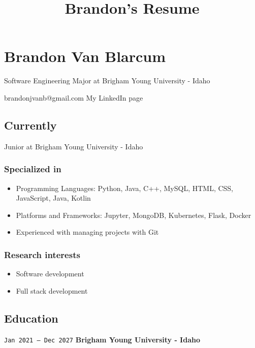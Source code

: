 \documentclass[
  letterpaper,
  DIV=11,
  numbers=noendperiod]{scrartcl}
\title{Brandon's Resume}
\author{}
\date{}
\begin{document}
\maketitle


\section{Brandon Van Blarcum}\label{brandon-van-blarcum}

Software Engineering Major at Brigham Young University - Idaho

\label{webaddress}
brandonjvanb@gmail.com \textbar{} My LinkedIn page

\subsection{Currently}\label{currently}

Junior at Brigham Young University - Idaho

\subsubsection{Specialized in}\label{specialized-in}

\begin{itemize}
\item
  Programming Languages: Python, Java, C++, MySQL, HTML, CSS,
  JavaScript, Java, Kotlin
\item
  Platforms and Frameworks: Jupyter, MongoDB, Kubernetes, Flask, Docker
\item
  Experienced with managing projects with Git
\end{itemize}

\subsubsection{Research interests}\label{research-interests}

\begin{itemize}
\item
  Software development
\item
  Full stack development
\end{itemize}

\subsection{Education}\label{education}

\texttt{Jan\ 2021\ –\ Dec\ 2027} \textbf{Brigham Young University -
Idaho}
\end{document}
